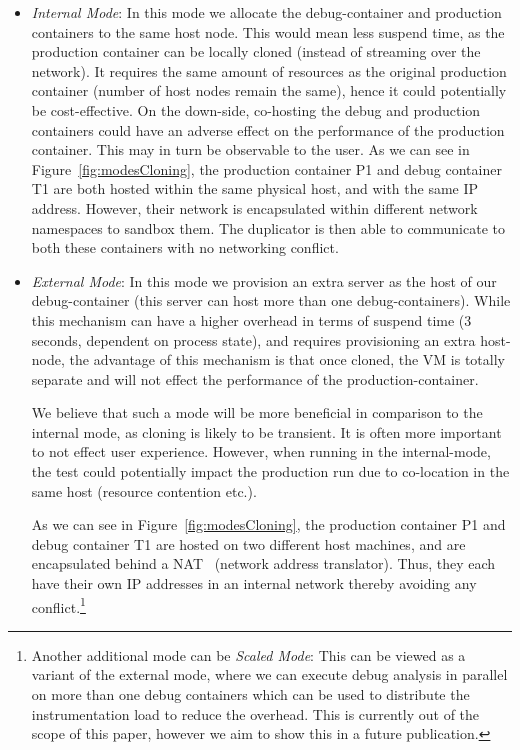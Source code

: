 \begin{itemize}[leftmargin=*,topsep=0pt,itemsep=-1ex,partopsep=1ex,parsep=1ex]

\item \textit{Internal Mode}: In this mode we allocate the debug-container and  production containers to the same host node. 
This would mean less suspend time, as the production container can be locally cloned (instead of streaming over the network). 
It requires the same amount of resources as the original production container (number of host nodes remain the same), 
hence it could potentially be cost-effective.
On the down-side, co-hosting the debug and production containers could have an adverse effect on the performance of the production container.
This may in turn be observable to the user.
As we can see in Figure~\ref{fig:modesCloning}, the production container P1 and debug container T1 are both hosted within the same physical host, and with the same IP address.
However, their network is encapsulated within different network namespaces to sandbox them.
The duplicator is then able to communicate to both these containers with no networking conflict.

\item \textit{External Mode}: In this mode we provision an extra server as the host of our debug-container (this server can host more than one debug-containers). 
While this mechanism can have a higher overhead in terms of suspend time (3 seconds, dependent on process state), and requires provisioning an extra host-node, the advantage of this mechanism is that once cloned, the VM is totally separate and will not effect the performance of the production-container.

We believe that such a mode will be more beneficial in comparison to the internal mode, as cloning is likely to be transient. 
It is often more important to not effect user experience. 
However, when running in the internal-mode, the test could potentially 
impact the production run due to co-location in the same host 
(resource contention etc.).

As we can see in Figure~\ref{fig:modesCloning}, the production container P1 and debug container T1 are hosted on two different host machines, and are encapsulated behind a NAT~\cite{nat} (network address translator).
Thus, they each have their own IP addresses in an internal network thereby avoiding any 
conflict.\footnote{Another additional mode can be \textit{Scaled Mode}: 
This can be viewed as a variant of the external mode, where we can execute debug analysis in parallel on more than one debug containers which can be used to distribute the instrumentation load to reduce the overhead. 
This is currently out of the scope of this paper, however we aim to show this in a future publication.}

\end{itemize}

